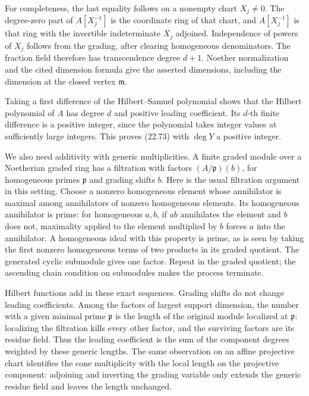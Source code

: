 \documentclass[
  11pt,
  a4paper,
]{article}
\newcounter{none} %
\begin{document}
For completeness, the last equality follows on a nonempty chart
\(X_j\ne0\). The degree-zero part of \(A[X_j^{-1}]\) is the coordinate
ring of that chart, and \(A[X_j^{-1}]\) is that ring with the invertible
indeterminate \(X_j\) adjoined. Independence of powers of \(X_j\)
follows from the grading, after clearing homogeneous denominators. The
fraction field therefore has transcendence degree \(d+1\). Noether
normalization and the cited dimension formula give the asserted
dimensions, including the dimension at the closed vertex
\(\mathfrak m\).

Taking a first difference of the Hilbert--Samuel polynomial shows that
the Hilbert polynomial of \(A\) has degree \(d\) and positive leading
coefficient. Its \(d\)-th finite difference is a positive integer, since
the polynomial takes integer values at sufficiently large integers. This
proves (22.73) with \(\deg Y\) a positive integer.

We also need additivity with generic multiplicities. A finite graded
module over a Noetherian graded ring has a filtration with factors
\((A/\mathfrak p)(b)\), for homogeneous primes \(\mathfrak p\) and
grading shifts \(b\). Here is the usual filtration argument in this
setting. Choose a nonzero homogeneous element whose annihilator is
maximal among annihilators of nonzero homogeneous elements. Its
homogeneous annihilator is prime: for homogeneous \(a,b\), if \(ab\)
annihilates the element and \(b\) does not, maximality applied to the
element multiplied by \(b\) forces \(a\) into the annihilator. A
homogeneous ideal with this property is prime, as is seen by taking the
first nonzero homogeneous terms of two products in its graded quotient.
The generated cyclic submodule gives one factor. Repeat in the graded
quotient; the ascending chain condition on submodules makes the process
terminate.

Hilbert functions add in these exact sequences. Grading shifts do not
change leading coefficients. Among the factors of largest support
dimension, the number with a given minimal prime \(\mathfrak p\) is the
length of the original module localized at \(\mathfrak p\): localizing
the filtration kills every other factor, and the surviving factors are
its residue field. Thus the leading coefficient is the sum of the
component degrees weighted by these generic lengths. The same
observation on an affine projective chart identifies the cone
multiplicity with the local length on the projective component:
adjoining and inverting the grading variable only extends the generic
residue field and leaves the length unchanged.
\end{document}
